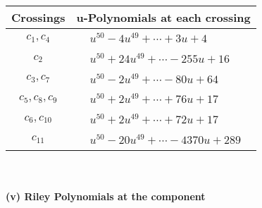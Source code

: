 \documentclass[1p]{elsarticle_modified}
\theoremstyle{definition}
\begin{document}
\begin{tabular}{m{50pt}|m{274pt}}
Crossings & \hspace{64pt}u-Polynomials at each crossing \\
\hline $$\begin{aligned}c_{1},c_{4}\end{aligned}$$&$\begin{aligned}
&u^{50}-4 u^{49}+\cdots+3 u+4
\end{aligned}$\\
\hline $$\begin{aligned}c_{2}\end{aligned}$$&$\begin{aligned}
&u^{50}+24 u^{49}+\cdots-255 u+16
\end{aligned}$\\
\hline $$\begin{aligned}c_{3},c_{7}\end{aligned}$$&$\begin{aligned}
&u^{50}-2 u^{49}+\cdots-80 u+64
\end{aligned}$\\
\hline $$\begin{aligned}c_{5},c_{8},c_{9}\end{aligned}$$&$\begin{aligned}
&u^{50}+2 u^{49}+\cdots+76 u+17
\end{aligned}$\\
\hline $$\begin{aligned}c_{6},c_{10}\end{aligned}$$&$\begin{aligned}
&u^{50}+2 u^{49}+\cdots+72 u+17
\end{aligned}$\\
\hline $$\begin{aligned}c_{11}\end{aligned}$$&$\begin{aligned}
&u^{50}-20 u^{49}+\cdots-4370 u+289
\end{aligned}$\\
\hline
\end{tabular}\\~\\
\newpage\renewcommand{\arraystretch}{1}
\flushleft \textbf{(v) Riley Polynomials at the component}\newline \\
\end{document}
